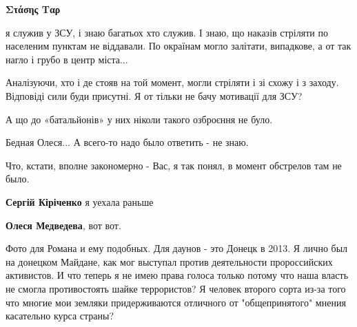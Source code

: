 \begin{itemize}
\begin{itemize}
 
\textbf{Στάσης Ταρ} 

я служив у ЗСУ, і знаю багатьох хто служив. І знаю, що наказів стріляти по
населеним пунктам не віддавали. По окраїнам могло залітати, випадкове, а от так
нагло і грубо в центр міста...

Аналізуючи, хто і де стояв на той момент, могли стріляти і зі схожу і з заходу.
Відповіді сили буди присутні. Я от тільки не бачу мотивації для ЗСУ?

А що до «батальйонів» у них ніколи такого озброєння не було.

 
Бедная Олеся... А всего-то надо было ответить - не знаю.

Что, кстати, вполне закономерно - Вас, я так понял, в момент обстрелов там не было.

 
\textbf{Сергій Кіріченко} я уехала раньше

 
\textbf{Олеся Медведева}, вот вот.

 

Фото для Романа и ему подобных. Для даунов - это Донецк в 2013. Я лично был на
донецком Майдане, как мог выступал против деятельности пророссийских
активистов. И что теперь я не имею права голоса только потому что наша власть
не смогла противостоять шайке террористов? Я человек второго сорта из-за того
что многие мои земляки придерживаются отличного от "общепринятого" мнения
касательно курса страны?


\end{itemize}
\end{itemize}
